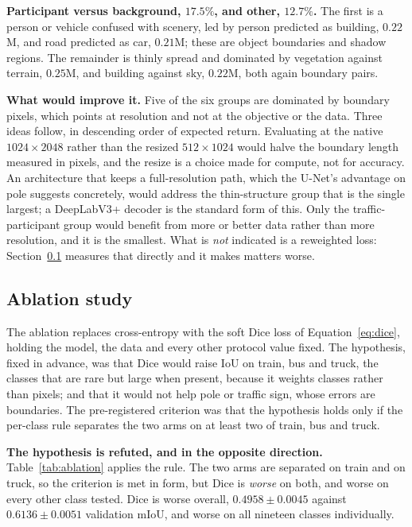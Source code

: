 \textbf{Participant versus background, $17.5\%$, and other, $12.7\%$.} The first is a person or
vehicle confused with scenery, led by person predicted as building, $0.22$M, and road predicted
as car, $0.21$M; these are object boundaries and shadow regions. The remainder is thinly spread
and dominated by vegetation against terrain, $0.25$M, and building against sky, $0.22$M, both
again boundary pairs.

\textbf{What would improve it.} Five of the six groups are dominated by boundary pixels, which
points at resolution and not at the objective or the data. Three ideas follow, in descending
order of expected return. Evaluating at the native $1024 \times 2048$ rather than the resized
$512 \times 1024$ would halve the boundary length measured in pixels, and the resize is a choice
made for compute, not for accuracy. An architecture that keeps a full-resolution path, which the
U-Net's advantage on pole suggests concretely, would address the thin-structure group that is the
single largest; a DeepLabV3+ decoder is the standard form of this. Only the traffic-participant
group would benefit from more or better data rather than more resolution, and it is the smallest.
What is \emph{not} indicated is a reweighted loss: Section~\ref{subsec:results-6} measures that
directly and it makes matters worse.

\subsection{Ablation study}
\label{subsec:results-6}

The ablation replaces cross-entropy with the soft Dice loss of Equation~\ref{eq:dice}, holding
the model, the data and every other protocol value fixed. The hypothesis, fixed in advance, was
that Dice would raise IoU on train, bus and truck, the classes that are rare but large when
present, because it weights classes rather than pixels; and that it would not help pole or
traffic sign, whose errors are boundaries. The pre-registered criterion was that the hypothesis
holds only if the per-class rule separates the two arms on at least two of train, bus and truck.

\textbf{The hypothesis is refuted, and in the opposite direction.}
Table~\ref{tab:ablation} applies the rule. The two arms are separated on train and on truck, so
the criterion is met in form, but Dice is \emph{worse} on both, and worse on every other class
tested. Dice is worse overall, $0.4958 \pm 0.0045$ against $0.6136 \pm 0.0051$ validation mIoU,
and worse on all nineteen classes individually.

